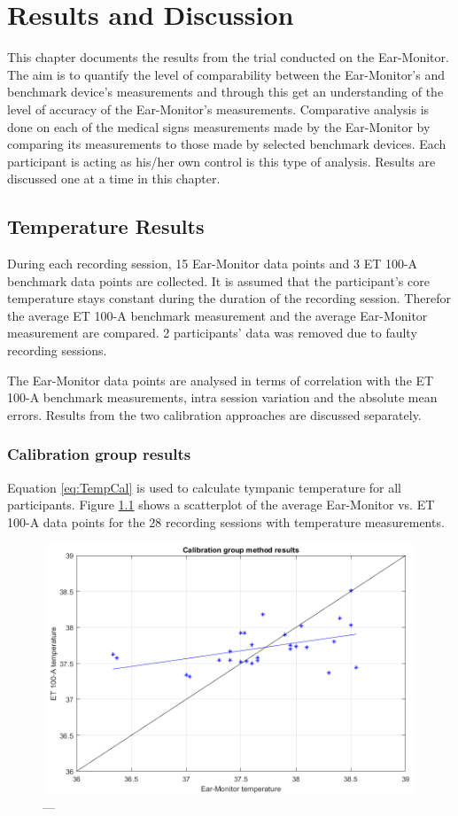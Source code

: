 \chapter{Results and Discussion}
\label{chp:Results and Discussion}
This chapter documents the results from the trial conducted on the Ear-Monitor. The aim is to quantify the level of comparability between the Ear-Monitor's and benchmark device's measurements and through this get an understanding of the level of accuracy of the Ear-Monitor's measurements. Comparative analysis is done on each of the medical signs measurements made by the Ear-Monitor by comparing its measurements to those made by selected benchmark devices. Each participant is acting as his/her own control is this type of analysis. Results are discussed one at a time in this chapter.

\section{Temperature Results}
During each recording session, 15 Ear-Monitor data points and 3 ET 100-A benchmark data points are collected. It is assumed that the participant's core temperature stays constant during the duration of the recording session. Therefor the average ET 100-A benchmark measurement and the average Ear-Monitor measurement are compared. 2 participants' data was removed due to faulty recording sessions.

\medskip

The Ear-Monitor data points are analysed in terms of correlation with the ET 100-A benchmark measurements, intra session variation and the absolute mean errors. Results from the two calibration approaches are discussed separately.

\subsection{Calibration group results}
Equation \ref{eq:TempCal} is used to calculate tympanic temperature for all participants. Figure \ref{fig:Temp1Scatter} shows a scatterplot of the average Ear-Monitor vs. ET 100-A data points for the 28 recording sessions with temperature measurements.

\begin{figure}[H]
   \centering
   \includegraphics[width=12cm,height=7.5cm]{figs/Temp1Scatter.png}
   \caption{---}
   \label{fig:Temp1Scatter}
\end{figure}

